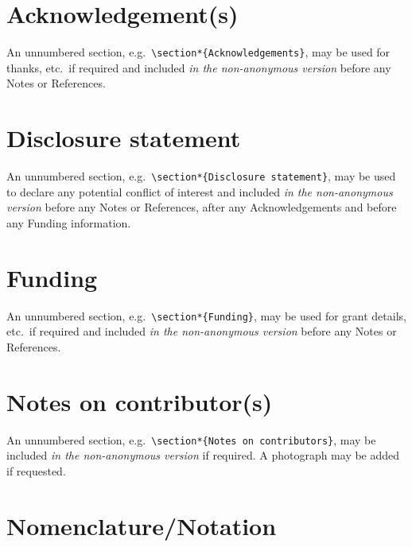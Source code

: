 \documentclass[]{interact}
\theoremstyle{plain}%
\theoremstyle{definition}
\theoremstyle{remark}
\begin{document}
\section*{Acknowledgement(s)}

An unnumbered section, e.g.\ \verb"\section*{Acknowledgements}", may be used for thanks, etc.\ if required and included \emph{in the non-anonymous version} before any Notes or References.


\section*{Disclosure statement}

An unnumbered section, e.g.\ \verb"\section*{Disclosure statement}", may be used to declare any potential conflict of interest and included \emph{in the non-anonymous version} before any Notes or References, after any Acknowledgements and before any Funding information.


\section*{Funding}

An unnumbered section, e.g.\ \verb"\section*{Funding}", may be used for grant details, etc.\ if required and included \emph{in the non-anonymous version} before any Notes or References.


\section*{Notes on contributor(s)}

An unnumbered section, e.g.\ \verb"\section*{Notes on contributors}", may be included \emph{in the non-anonymous version} if required. A photograph may be added if requested.


\section*{Nomenclature/Notation}
\end{document}
